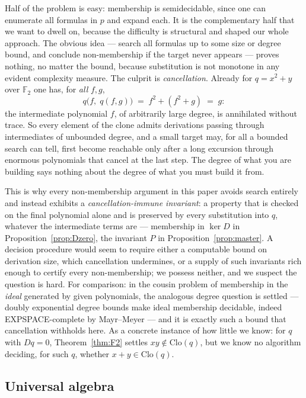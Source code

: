 \documentclass[11pt]{article}
\theoremstyle{definition}
\theoremstyle{remark}
\newcommand{\F}{\mathbb{F}}
\newcommand{\Clo}{\mathrm{Clo}}
\begin{document}
Half of the problem is easy: membership is semidecidable, since one
can enumerate all formulas in $p$ and expand each.  It is the
complementary half that we want to dwell on, because the difficulty
is structural and shaped our whole approach.  The obvious idea ---
search all formulas up to some size or degree bound, and conclude
non-membership if the target never appears --- proves nothing, no
matter the bound, because substitution is not monotone in any evident
complexity measure.  The culprit is \emph{cancellation}.  Already for
$q = x^2 + y$ over $\F_2$ one has, for \emph{all} $f, g$,
\[
  q\bigl(f,\; q(f, g)\bigr) \;=\; f^2 + (f^2 + g) \;=\; g :
\]
the intermediate polynomial $f$, of arbitrarily large degree, is
annihilated without trace.  So every element of the clone admits
derivations passing through intermediates of unbounded degree, and a
small target may, for all a bounded search can tell, first become
reachable only after a long excursion through enormous polynomials
that cancel at the last step.  The degree of what you are building
says nothing about the degree of what you must build it from.

This is why every non-membership argument in this paper avoids search
entirely and instead exhibits a \emph{cancellation-immune invariant}:
a property that is checked on the final polynomial alone and is
preserved by every substitution into $q$, whatever the intermediate
terms are --- membership in $\ker D$ in
Proposition~\ref{prop:Dzero}, the invariant $P$ in
Proposition~\ref{prop:master}.  A decision procedure would seem to
require either a computable bound on derivation size, which
cancellation undermines, or a supply of such invariants
rich enough to certify every non-membership; we possess neither,
and we suspect the question is hard.  For comparison: in the cousin
problem of membership in the \emph{ideal} generated by given
polynomials, the analogous degree question is settled --- doubly
exponential degree bounds make ideal membership decidable, indeed
EXPSPACE-complete by Mayr--Meyer \cite{MayrMeyer} --- and it is
exactly such a bound that cancellation withholds here.  As a
concrete instance of how
little we know: for $q$ with $Dq = 0$, Theorem~\ref{thm:F2} settles
$xy \notin \Clo(q)$, but we know no algorithm deciding, for such $q$,
whether $x + y \in \Clo(q)$.

\subsection*{Universal algebra}
\end{document}
